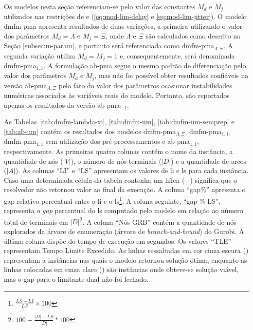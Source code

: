 Os modelos  nesta seção referenciam-se pelo  valor das constantes $M_d$  e $M_j$
utilizados  nas restrições  de  {\delay} e  {\jitter} (\ref{eq:mod-lim-delay}  e
\ref{eq:mod-lim-jitter}). O  modelo \gls{dmfm-pma} apresenta resultados  de duas
variações, a primeira utilizando o valor dos parâmetros $M_d = \Lambda$ e $M_j =
\Xi$,  onde   $\Lambda$  e   $\Xi$  são  calculados   como  descrito   na  Seção
\ref{subsec:m-param},      e      portanto      será      referenciada      como
\gls{dmfm-pma}$_{\Lambda, \Xi}$. A  segunda variação utiliza $M_d = M_j  = 1$ e,
consequentemente,   será  denominada   \gls{dmfm-pma}$_{1,  1}$.   A  formulação
\gls{ab-pma} segue  o mesmo  padrão de diferenciação  pelo valor  dos parâmetros
$M_d$  e $M_j$,  mas  não foi  possível obter  resultados  confiáveis na  versão
\gls{ab-pma}$_{\Lambda,  \Xi}$  pelo  fato  do valor  dos  parâmetros  ocasionar
instabilidades numéricas associados às variáveis  reais do modelo. Portanto, são
reportados apenas os resultados da versão \gls{ab-pma}$_{1, 1}$.

As              Tabelas~\ref{tab:dmfm-lambda-xi},             \ref{tab:dmfm-um},
\ref{tab:dmfm-um-semprep}  e \ref{tab:ab-um}  contém os  resultados dos  modelos
\gls{dmfm-pma}$_{\Lambda,  \Xi}$,  \gls{dmfm-pma}$_{1, 1}$,  \gls{dmfm-pma}$_{1,
1}$   sem   utilização   dos   pré-processamentos   e   \gls{ab-pma}$_{1,   1}$,
respectivamente.  As primeiras  quatro colunas  contém  o nome  da instância,  a
quantidade de nós ($|V|$),  o número de nós terminais ($|D|$)  e a quantidade de
arcos ($|A|$).  As colunas ``LI'' e  ``LS'' apresentam os valores  de \gls{li} e
\gls{ls} para cada instância. Caso uma  determinada célula da tabela contenha um
hífen ($-$) significa que o resolvedor  não retornou valor ao final da execução.
A coluna  ``gap$\%$'' apresenta o gap  relativo percentual entre o  \gls{li} e o
\gls{ls}\footnote{$\frac{LS  - LI}{LS}  \times 100$}.  A coluna  seguinte, ``gap
$\%$ LS'', representa  o {\em gap} percentual do \gls{ls}  computado pelo modelo
em relação  ao número total  de terminais  em $|D|$\footnote{$100 -  \frac{|D| -
LS}{|D|} * 100$}. A coluna ``Nós GRB''  contém a quantidade de nós explorados da
árvore  de enumeração  (árvore de  {\em branch-and-bound})  do Gurobi.  A última
coluna dispõe do  tempo de execução em segundos. Os  valores ``TLE'' representam
Tempo   Limite   Excedido.  As   linhas   ressaltadas   em  cor   cinza   escura
(\crule[gr]{3mm}{3mm})  representam a  instâncias  nas quais  o modelo  retornou
solução    ótima,    enquanto   as    linhas    colocadas    em   cinza    claro
(\crule[lgr]{3mm}{3mm}) são instâncias onde obteve-se  solução viável, mas o gap
para o limitante dual não foi fechado.
\newpage

